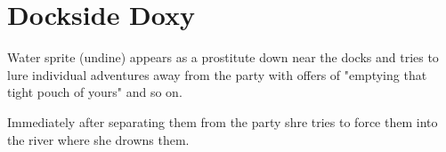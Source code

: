 \documentclass[a4paper]{dnd5}
\begin{document}
\section*{Dockside Doxy}

\begin{precis}
\item Water sprite (undine) appears as a prostitute down near the docks and tries to lure individual adventures away from the party with offers of "emptying that tight pouch of yours" and so on.  
\item Immediately after separating them from the party shre tries to force them into the river where she drowns them.
\end{precis}


\begin{outs} 
\item 
\item 
\end{outs}

\begin{purpose}
\item 
\item 
\end{purpose}
     
\end{document}
